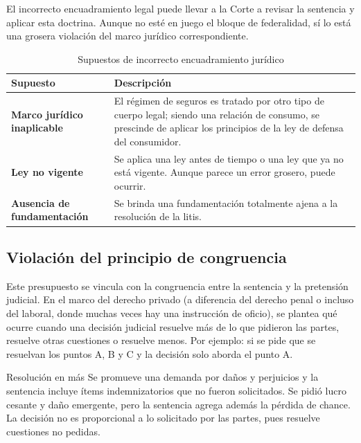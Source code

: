 \documentclass[12pt,oneside]{book}
\begin{document}
El incorrecto encuadramiento legal puede llevar a la Corte a revisar la sentencia y aplicar esta doctrina. Aunque no esté en juego el bloque de federalidad, sí lo está una grosera violación del marco jurídico correspondiente.

\begin{table}[H]
\centering
\caption{Supuestos de incorrecto encuadramiento jurídico}
\begin{tabularx}{\textwidth}{Q{0.28\textwidth}Y}
\toprule
\textbf{Supuesto} & \textbf{Descripción} \\
\midrule
\textbf{Marco jurídico inaplicable} & El régimen de seguros es tratado por otro tipo de cuerpo legal; siendo una relación de consumo, se prescinde de aplicar los principios de la ley de defensa del consumidor. \\
\addlinespace
\textbf{Ley no vigente} & Se aplica una ley antes de tiempo o una ley que ya no está vigente. Aunque parece un error grosero, puede ocurrir. \\
\addlinespace
\textbf{Ausencia de fundamentación} & Se brinda una fundamentación totalmente ajena a la resolución de la litis. \\
\bottomrule
\end{tabularx}
\end{table}

\subsection{Violación del principio de congruencia}

Este presupuesto se vincula con la congruencia entre la sentencia y la pretensión judicial. En el marco del derecho privado (a diferencia del derecho penal o incluso del laboral, donde muchas veces hay una instrucción de oficio), se plantea qué ocurre cuando una decisión judicial resuelve más de lo que pidieron las partes, resuelve otras cuestiones o resuelve menos. Por ejemplo: si se pide que se resuelvan los puntos A, B y C y la decisión solo aborda el punto A.

\begin{example}{Resolución en más}
Se promueve una demanda por daños y perjuicios y la sentencia incluye ítems indemnizatorios que no fueron solicitados. Se pidió lucro cesante y daño emergente, pero la sentencia agrega además la pérdida de chance. La decisión no es proporcional a lo solicitado por las partes, pues resuelve cuestiones no pedidas.
\end{example}
\end{document}
